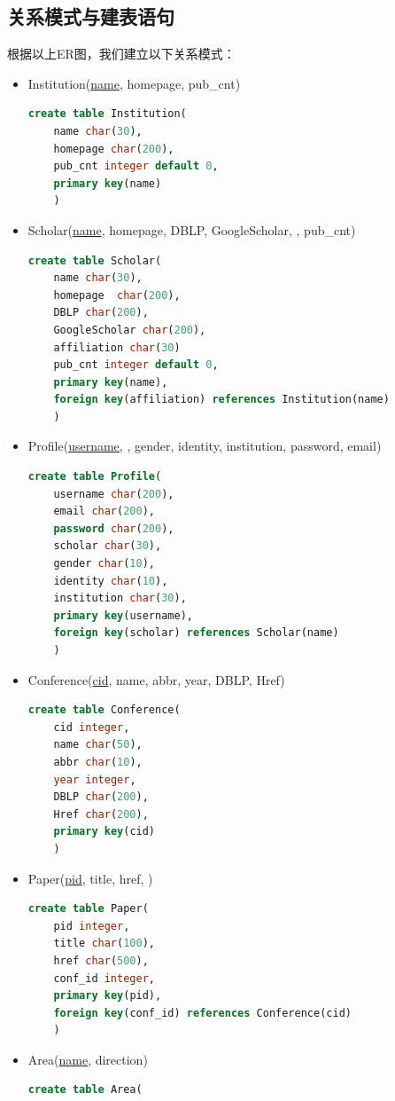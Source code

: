 \subsection{关系模式与建表语句}
根据以上ER图，我们建立以下关系模式：
\begin{itemize}
\item {\myfont Institution(\uline{name}, homepage, pub\_cnt)}
\begin{lstlisting}[language=SQL]  
create table Institution(
	name char(30),
	homepage char(200),
	pub_cnt integer default 0,
	primary key(name)
	)
\end{lstlisting}
\item {\myfont Scholar(\uline{name}, homepage, DBLP, GoogleScholar, , pub\_cnt)}
\begin{lstlisting}[language=SQL]  
create table Scholar(
	name char(30),
	homepage  char(200),
	DBLP char(200),
	GoogleScholar char(200),
	affiliation char(30)
	pub_cnt integer default 0,
	primary key(name),
	foreign key(affiliation) references Institution(name)
	)
\end{lstlisting}
\item {\myfont Profile(\uline{username}, , gender, identity, institution, password, email)}
\begin{lstlisting}[language=SQL]  
create table Profile(
	username char(200),
	email char(200),
	password char(200),
	scholar char(30),
	gender char(10),
	identity char(10),
	institution char(30),
	primary key(username),
	foreign key(scholar) references Scholar(name)
	)
\end{lstlisting}
\item {\myfont Conference(\uline{cid}, name, abbr, year, DBLP, Href)}
\begin{lstlisting}[language=SQL]  
create table Conference(
	cid integer,
	name char(50),
	abbr char(10),
	year integer,
	DBLP char(200),
	Href char(200),
	primary key(cid)
	)
\end{lstlisting}
\item {\myfont Paper(\uline{pid}, title, href, )}
\begin{lstlisting}[language=SQL]  
create table Paper(
	pid integer,
	title char(100),
	href char(500),
	conf_id integer,
	primary key(pid),
	foreign key(conf_id) references Conference(cid)
	)
\end{lstlisting}
\item {\myfont Area(\uline{name}, direction)}
\begin{lstlisting}[language=SQL] 
create table Area(

\end{lstlisting}
\end{itemize}
